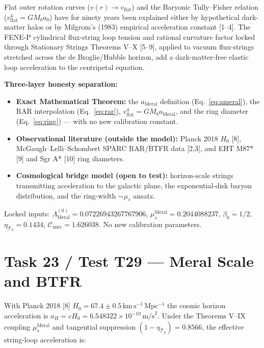\documentclass[12pt,a4paper]{article}
\begin{document}
Flat outer rotation curves ($v(r)\to v_{\mathrm{flat}}$) and the Baryonic
Tully--Fisher relation ($v_{\mathrm{flat}}^4 = GM_b a_0$) have for ninety years
been explained either by hypothetical dark-matter halos or by Milgrom's (1983)
empirical acceleration constant [1--4]. The FENE-P cylindrical flux-string loop
tension and rational curvature factor locked through Stationary Strings
Theorems V--X [5--9], applied to vacuum flux-strings stretched across the
de Broglie/Hubble horizon, add a dark-matter-free elastic loop acceleration to
the centripetal equation.

\textbf{Three-layer honesty separation:}
\begin{itemize}
    \item \textbf{Exact Mathematical Theorem:} the $a_{\mathrm{Meral}}$
    definition (Eq.~\ref{eq:ameral}), the RAR interpolation (Eq.~\ref{eq:rar}),
    $v_{\mathrm{flat}}^4 = GM_b a_{\mathrm{Meral}}$, and the ring diameter
    (Eq.~\ref{eq:ring}) --- with no new calibration constant.
    \item \textbf{Observational literature (outside the model):} Planck 2018
    $H_0$ [8], McGaugh--Lelli--Schombert SPARC RAR/BTFR data [2,3], and
    EHT M87* [9] and Sgr A* [10] ring diameters.
    \item \textbf{Cosmological bridge model (open to test):} horizon-scale
    strings transmitting acceleration to the galactic plane, the exponential-disk
    baryon distribution, and the ring-width $\sim \mu_s$ ansatz.
\end{itemize}
Locked inputs: $\Lambda_{\mathrm{Meral}}^{(0)} = 0.07226943267767906$,
$\mu_s^{\mathrm{Meral}} = 0.2044088237$, $\beta_0 = 1/2$,
$\eta_{\mathcal{T}_0} = 0.1434$,
$\mathcal{C}_{\mathrm{univ}} = 1.626038$. No new calibration parameters.

\section{Task 23 / Test T29 --- Meral Scale and BTFR}

With Planck 2018 [8] $H_0 = 67.4\pm 0.5\,\mathrm{km\,s^{-1}\,Mpc^{-1}}$ the
cosmic horizon acceleration is
$a_H = cH_0 = 6.548322\times 10^{-10}\,\mathrm{m/s}^2$. Under the Theorems V--IX
coupling $\mu_s^{\mathrm{Meral}}$ and tangential suppression
$(1-\eta_{\mathcal{T}_0}) = 0.8566$, the effective string-loop acceleration is:
\end{document}
